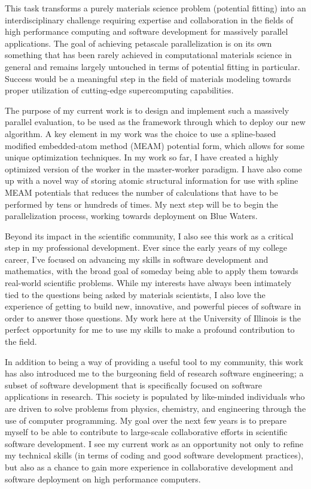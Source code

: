 \documentclass[11pt]{article}
\begin{document}
This task transforms a purely materials science problem (potential fitting) into an interdisciplinary challenge requiring expertise and collaboration in the fields of high performance computing and software development for massively parallel applications. The goal of achieving petascale parallelization is on its own something that has been rarely achieved in computational materials science in general and remains largely untouched in terms of potential fitting in particular. Success would be a meaningful step in the field of materials modeling towards proper utilization of cutting-edge supercomputing capabilities.

The purpose of my current work is to design and implement such a massively parallel evaluation, to be used as the framework through which to deploy our new algorithm. A key element in my work was the choice to use a spline-based modified embedded-atom method (MEAM) potential form, which allows for some unique optimization techniques. In my work so far, I have created a highly optimized version of the worker in the master-worker paradigm. I have also come up with a novel way of storing atomic structural information for use with spline MEAM potentials that reduces the number of calculations that have to be performed by tens or hundreds of times. My next step will be to begin the parallelization process, working towards deployment on Blue Waters.

Beyond its impact in the scientific community, I also see this work as a critical step in my professional development. Ever since the early years of my college career, I've focused on advancing my skills in software development and mathematics, with the broad goal of someday being able to apply them towards real-world scientific problems. While my interests have always been intimately tied to the questions being asked by materials scientists, I also love the experience of getting to build new, innovative, and powerful pieces of software in order to answer those questions. My work here at the University of Illinois is the perfect opportunity for me to use my skills to make a profound contribution to the field.

In addition to being a way of providing a useful tool to my community, this work has also introduced me to the burgeoning field of research software engineering; a subset of software development that is specifically focused on software applications in research. This society is populated by like-minded individuals who are driven to solve problems from physics, chemistry, and engineering through the use of computer programming. My goal over the next few years is to prepare myself to be able to contribute to large-scale collaborative efforts in scientific software development. I see my current work as an opportunity not only to refine my technical skills (in terms of coding and good software development practices), but also as a chance to gain more experience in collaborative development and software deployment on high performance computers.
\end{document}

